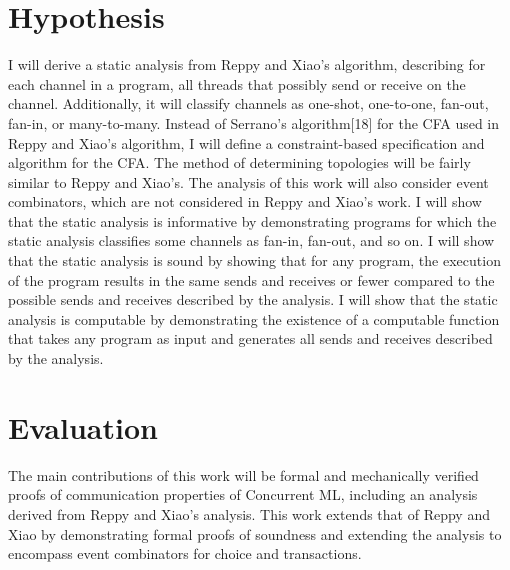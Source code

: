\documentclass{article}
\begin{document}
\section{Hypothesis}
I will derive a static analysis from Reppy and Xiao's algorithm, describing for each channel in a program, all threads that possibly send or receive on the channel.  Additionally, it will classify channels as one-shot, one-to-one, fan-out, fan-in, or many-to-many.  Instead of Serrano's algorithm[18] for the CFA used in Reppy and Xiao's algorithm, I will define a constraint-based specification and algorithm for the CFA.  The method of determining topologies will be fairly similar to Reppy and Xiao's.  The analysis of this work will also consider event combinators, which are not considered in Reppy and Xiao's work.  I will show that the static analysis is informative by demonstrating programs for which the static analysis classifies some channels as fan-in, fan-out, and so on.  I will show that the static analysis is sound by showing that for any program, the execution of the program results in the same sends and receives or fewer compared to the possible sends and receives described by the analysis.  I will show that the static analysis is computable by demonstrating the existence of a computable function that takes any program as input and generates all sends and receives described by the analysis.



\section{Evaluation}
The main contributions of this work will be formal and mechanically verified proofs of communication properties of Concurrent ML, including an analysis derived from Reppy and Xiao's analysis.  This work extends that of Reppy and Xiao by demonstrating formal proofs of soundness and extending the analysis to encompass event combinators for choice and transactions.
\end{document}
